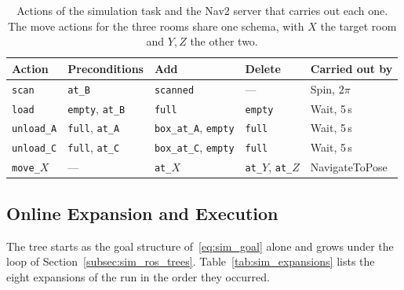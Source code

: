     \begin{table}[htbp]
        \centering
        \caption[Actions of the simulation task]{Actions of the simulation task and the Nav2 server that carries out each one. The move actions for the three rooms share one schema, with $X$ the target room and $Y, Z$ the other two.}
        \label{tab:sim_actions}
        \begin{tabular}{@{}lllll@{}}
            \toprule
            Action & Preconditions & Add & Delete & Carried out by \\
            \midrule
            \texttt{scan}       & \texttt{at\_B}                 & \texttt{scanned}                  & ---            & Spin, $2\pi$ \\
            \texttt{load}       & \texttt{empty}, \texttt{at\_B} & \texttt{full}                     & \texttt{empty} & Wait, 5\,s \\
            \texttt{unload\_A}  & \texttt{full}, \texttt{at\_A}  & \texttt{box\_at\_A}, \texttt{empty} & \texttt{full}  & Wait, 5\,s \\
            \texttt{unload\_C}  & \texttt{full}, \texttt{at\_C}  & \texttt{box\_at\_C}, \texttt{empty} & \texttt{full}  & Wait, 5\,s \\
            \texttt{move\_$X$}  & ---                            & \texttt{at\_$X$}                  & \texttt{at\_$Y$}, \texttt{at\_$Z$} & NavigateToPose \\
            \bottomrule
        \end{tabular}
    \end{table}

    \subsection{Online Expansion and Execution}
    \label{subsec:sim_run}
    The tree starts as the goal structure of~\eqref{eq:sim_goal} alone and grows under the loop of Section~\ref{subsec:sim_ros_trees}.
    Table~\ref{tab:sim_expansions} lists the eight expansions of the run in the order they occurred.

